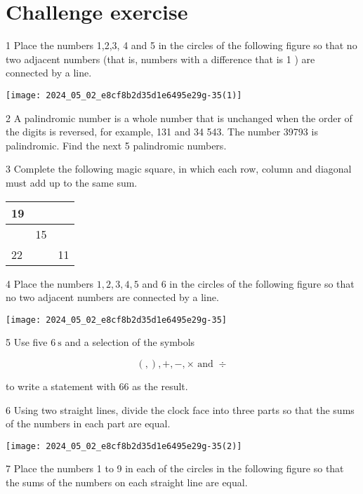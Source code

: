 \documentclass[10pt]{article}
\begin{document}
\section*{Challenge exercise}
1 Place the numbers 1,2,3, 4 and 5 in the circles of the following figure so that no two adjacent numbers (that is, numbers with a difference that is 1 ) are connected by a line.

\begin{center}
\texttt{[image: 2024\_05\_02\_e8cf8b2d35d1e6495e29g-35(1)]}
\end{center}

2 A palindromic number is a whole number that is unchanged when the order of the digits is reversed, for example, 131 and 34 543. The number 39793 is palindromic. Find the next 5 palindromic numbers.

3 Complete the following magic square, in which each row, column and diagonal must add up to the same sum.

\begin{center}
\begin{tabular}{|l|l|l|}
\hline
19 &  &  \\
\hline
 & 15 &  \\
\hline
22 &  & 11 \\
\hline
\end{tabular}
\end{center}

4 Place the numbers \(1,2,3,4,5\) and 6 in the circles of the following figure so that no two adjacent numbers are connected by a line.

\begin{center}
\texttt{[image: 2024\_05\_02\_e8cf8b2d35d1e6495e29g-35]}
\end{center}

5 Use five \(6 \mathrm{~s}\) and a selection of the symbols

\[
(,),+,-, \times \text { and } \div
\]

to write a statement with 66 as the result.

6 Using two straight lines, divide the clock face into three parts so that the sums of the numbers in each part are equal.

\begin{center}
\texttt{[image: 2024\_05\_02\_e8cf8b2d35d1e6495e29g-35(2)]}
\end{center}

7 Place the numbers 1 to 9 in each of the circles in the following figure so that the sums of the numbers on each straight line are equal.
\end{document}
